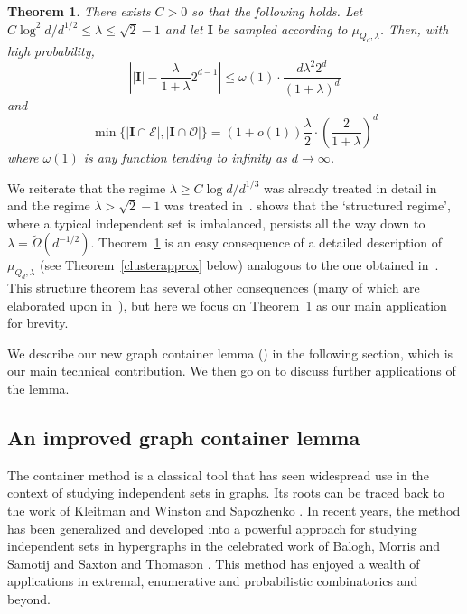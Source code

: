 \documentclass[10pt,a4paper]{amsart}
\newtheorem{thm}{Theorem}[section]
\theoremstyle{definition}
\newcommand{\cO}{\mathcal{O} }
\newcommand{\cE}{\mathcal{E} }
\newcommand{\beq}[1]{\begin{equation}\label{#1}}
\newcommand{\enq}[0]{\end{equation}}
\newcommand{\0}[0]{\emptyset}
\newcommand{\lam}{\lambda}
\begin{document}
\begin{thm}\label{thm:main} There exists $C>0$ so that the following holds.  Let $C\log^2d /d^{1/2}\leq \lam \leq \sqrt{2}-1$ and let $\mathbf{I}$ be sampled according to $\mu_{Q_d,\lam}$. Then, with high probability,
 \beq{expbig} \left| |\mathbf{I}| - \frac{\lam}{1+\lam}2^{d-1}\right| \leq \omega(1)\cdot\frac{d\lam^2 2^d}{(1+\lam)^d} \enq
 and
    \beq{expcube} \min\{ |\mathbf{I}\cap \cE|, |\mathbf{I}\cap \cO|\} =(1+o(1))\frac{\lam}{2}\cdot\left(\frac{2}{1+\lam}\right)^d\enq
    where $\omega(1)$ is any function tending to infinity as $d\rightarrow\infty$.
\end{thm}

We reiterate that the regime $\lam\geq C \log d/d^{1/3}$ was already treated in detail in~\cite{galvin_threshold,hypercube} and the regime $\lam > \sqrt{2}-1$ was treated in~\cite{galvin_threshold}.  shows that the `structured regime', where a typical independent set is imbalanced, persists all the way down to $\lam=\tilde \Omega(d^{-1/2})$. Theorem~\ref{thm:main} is an easy consequence of a detailed description of $\mu_{Q_d,\lam}$ (see Theorem~\ref{clusterapprox} below) analogous to the one obtained in~\cite{hypercube}.  This structure theorem has several other consequences (many of which are elaborated upon in~\cite{hypercube}), but here we focus on Theorem~\ref{thm:main} as our main application for brevity. 

We describe our new graph container lemma () in the following section, which is our main technical contribution. We then go on to discuss further applications of the lemma. 

\subsection{An improved graph container lemma}\label{subsec:containers}

The container method is a classical tool that has seen widespread use in the context of studying independent sets in graphs. Its roots can be traced back to the work of Kleitman and Winston \cite{kleitman1982number} and Sapozhenko \cite{sapocontainer}. In recent years, the method has been generalized and developed into a powerful approach for studying independent sets in hypergraphs in the celebrated work of Balogh, Morris and Samotij \cite{balogh2015independent} and Saxton and Thomason \cite{saxton2015hypergraph}. This method has enjoyed a wealth of applications in extremal, enumerative and probabilistic combinatorics and beyond.
\end{document}
